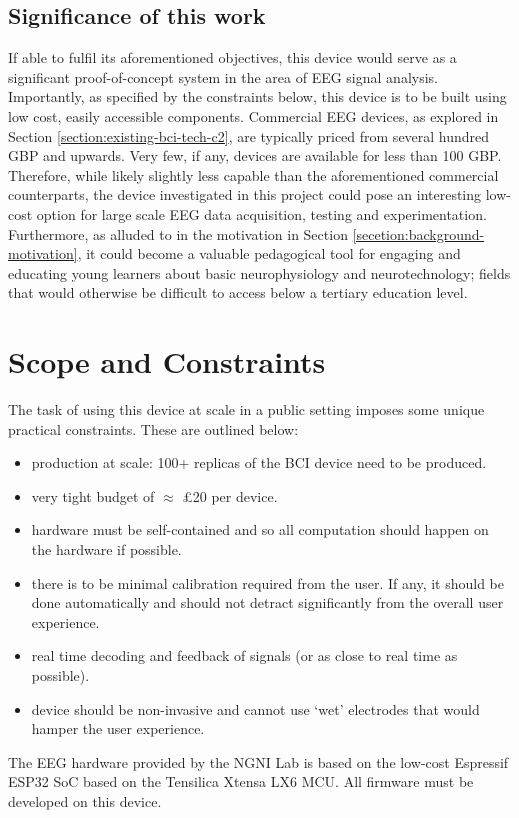 \subsection{Significance of this work}
If able to fulfil its aforementioned objectives, this device would serve as a significant proof-of-concept system in the area of EEG signal analysis. Importantly, as specified by the constraints below, this device is to be built using low cost, easily accessible components. Commercial EEG devices, as explored in Section \ref{section:existing-bci-tech-c2}, are typically priced from several hundred GBP and upwards. Very few, if any, devices are available for less than 100 GBP. Therefore, while likely slightly less capable than the aforementioned commercial counterparts, the device investigated in this project could pose an interesting low-cost option for large scale EEG data acquisition, testing and experimentation. Furthermore, as alluded to in the motivation in Section \ref{secetion:background-motivation}, it could become a valuable pedagogical tool for engaging and educating young learners about basic neurophysiology and neurotechnology; fields that would otherwise be difficult to access below a tertiary education level.


\section{Scope and Constraints}
\label{section:scope-constraints-intro}
The task of using this device at scale in a public setting imposes some unique practical constraints. These are outlined below:
\begin{itemize}
    \item production at scale: 100+ replicas of the BCI device need to be produced.
    \item very tight budget of $\approx$ £20 per device.
    \item hardware must be self-contained and so all computation should happen on the hardware if possible. 
    \item there is to be minimal calibration required from the user. If any, it should be done automatically and should not detract significantly from the overall user experience.
    \item real time decoding and feedback of signals (or as close to real time as possible).
    \item device should be non-invasive and cannot use `wet' electrodes that would hamper the user experience.
\end{itemize}
The EEG hardware provided by the NGNI Lab is based on the low-cost Espressif ESP32 SoC based on the Tensilica Xtensa LX6 MCU. All firmware must be developed on this device.

